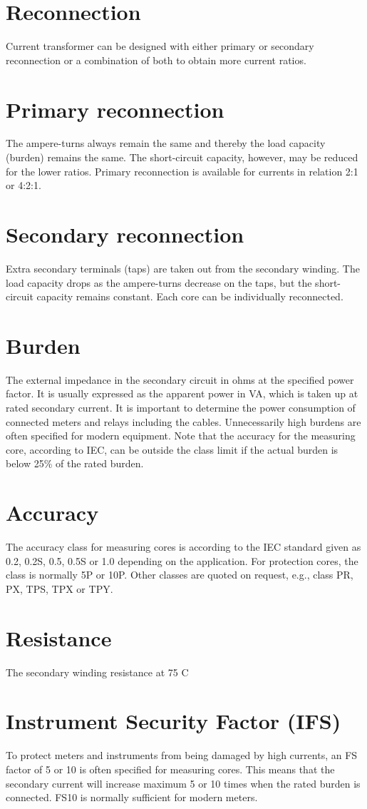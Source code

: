 \section*{Reconnection}
Current transformer can be designed with either primary or secondary reconnection or a combination of both to obtain more current ratios.
\section*{Primary reconnection}
The ampere-turns always remain the same and thereby the load capacity (burden) remains the same. The short-circuit capacity, however, may be reduced for the lower ratios. Primary reconnection is available for currents in relation 2:1 or 4:2:1.
\section*{Secondary reconnection}
Extra secondary terminals (taps) are taken out from the secondary winding. The load capacity drops as the ampere-turns decrease on the taps, but the short-circuit capacity remains constant. Each core can be individually reconnected.
\section*{Burden}
The external impedance in the secondary circuit in ohms at the specified power factor. It is usually expressed as the apparent power in VA, which is taken up at rated secondary current. It is important to determine the power consumption of connected meters and relays including the cables. Unnecessarily high burdens are often specified for modern equipment. Note that the accuracy for the measuring core, according to IEC, can be outside the class limit if the actual burden is below 25\% of the rated burden.

\section*{Accuracy}
The accuracy class for measuring cores is according to the IEC standard given as 0.2, 0.2S, 0.5, 0.5S or 1.0 depending on the application. For protection cores, the class is normally 5P or 10P. Other classes are quoted on request, e.g., class PR, PX, TPS, TPX or TPY.
\section*{Resistance}
The secondary winding resistance at 75 \textdegree C
\section*{Instrument Security Factor (IFS)}
To protect meters and instruments from being damaged by high currents, an FS factor of 5 or 10 is often specified for measuring cores. This means that the secondary current will increase maximum 5 or 10 times when the rated burden is connected. FS10 is normally sufficient for modern meters.
